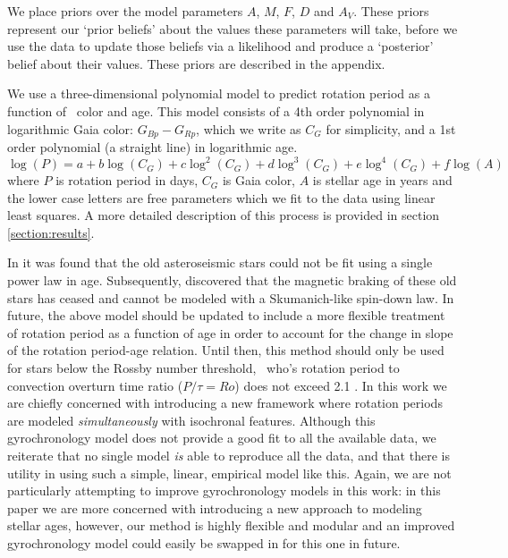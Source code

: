 We place priors over the model parameters $A$, $M$, $F$, $D$ and $A_V$.
These priors represent our `prior beliefs' about the values these parameters
will take, before we use the data to update those beliefs via a likelihood and
produce a `posterior' belief about their values.
These priors are described in the appendix.

We use a three-dimensional polynomial model to predict rotation period as a
function of \gaia\ color and age.
This model consists of a 4th order polynomial in logarithmic Gaia color:
$G_{Bp} - G_{Rp}$, which we write as $C_G$ for simplicity, and a 1st order
polynomial (a straight line) in logarithmic age.
\begin{equation}
    \log(P) = a + b\log(C_G) + c\log^2(C_G) + d\log^3(C_G) + e\log^4(C_G)
    + f\log(A)
\label{eqn:gyro}
\end{equation}
where $P$ is rotation period in days, $C_G$ is Gaia color, $A$ is stellar age
in years and the lower case letters are free parameters which we fit to the
data using linear least squares.
A more detailed description of this process is provided in section
\ref{section:results}.

In \citet{angus2015} it was found that the old asteroseismic stars could not
be fit using a single power law in age.
Subsequently, \citet{vansaders2016} discovered that the magnetic braking of
these old stars has ceased and cannot be modeled with a Skumanich-like
spin-down law.
In future, the above model should be updated to include a more flexible
treatment of rotation period as a function of age in order to account for the
change in slope of the rotation period-age relation.
Until then, this method should only be used for stars below the Rossby number
threshold, \ie\ who's rotation period to convection overturn time ratio
($P/\tau = Ro$) does not exceed 2.1 \citep{vansaders2016}.
In this work we are chiefly concerned with introducing a new framework where
rotation periods are modeled {\it simultaneously} with isochronal features.
Although this gyrochronology model does not provide a good fit to all the
available data, we reiterate that no single model {\it is} able to reproduce
all the data, and that there is utility in using such a simple, linear,
empirical model like this.
Again, we are not particularly attempting to improve gyrochronology models in
this work: in this paper we are more concerned with introducing a new approach
to modeling stellar ages, however, our method is highly flexible and modular
and an improved gyrochronology model could easily be swapped in for this one
in future.

